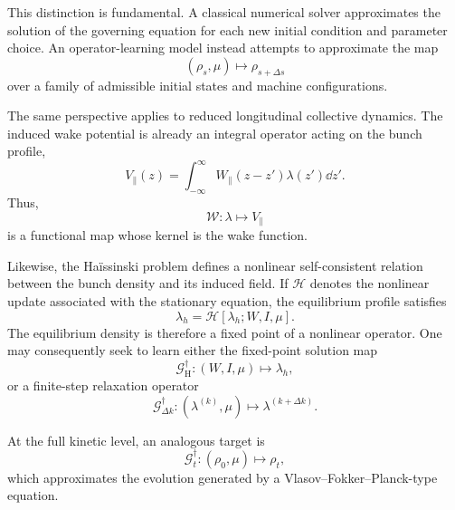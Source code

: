 This distinction is fundamental. A classical numerical solver approximates the solution of the governing equation for each new initial condition and parameter choice. An operator-learning model instead attempts to approximate the map
\begin{equation}
(\rho_s,\mu)
\longmapsto
\rho_{s+\Delta s}
\end{equation}
over a family of admissible initial states and machine configurations.

The same perspective applies to reduced longitudinal collective dynamics. The induced wake potential is already an integral operator acting on the bunch profile, 
\begin{equation}
V_{\parallel}(z)
=
\int_{-\infty}^{\infty}
W_{\parallel}(z-z')
\lambda(z')
\dd z'.
\label{eq:NO_wake_conv}
\end{equation}
Thus,
\begin{equation}
\mathcal{W}
:
\lambda
\longmapsto
V_{\parallel}
\end{equation}
is a functional map whose kernel is the wake function.

Likewise, the Ha\"issinski problem defines a nonlinear self-consistent relation between the bunch density and its induced field. If
$\mathcal{H}$ denotes the nonlinear update associated with the stationary equation, the equilibrium profile satisfies \cite{funkner_haissinski_2025}
\begin{equation}
\lambda_h
=
\mathcal{H}
\left[
\lambda_h;
W,
I,
\mu
\right].
\label{eq:NO_haissinski_fixedpoint}
\end{equation}
The equilibrium density is therefore a fixed point of a nonlinear operator. One may consequently seek to learn either the fixed-point solution map
\begin{equation}
\mathcal{G}^{\dagger}_{\mathrm{H}}
:
(W,I,\mu)
\longmapsto
\lambda_h,
\label{eq:NO_haissinski_operator}
\end{equation}
or a finite-step relaxation operator
\begin{equation}
\mathcal{G}^{\dagger}_{\Delta k}
:
(\lambda^{(k)},\mu)
\longmapsto
\lambda^{(k+\Delta k)}.
\label{eq:NO_relaxation_operator}
\end{equation}

At the full kinetic level, an analogous target is
\begin{equation}
\mathcal{G}^{\dagger}_{t}
:
(\rho_0,\mu)
\longmapsto
\rho_t,
\label{eq:NO_VFP_operator}
\end{equation}
which approximates the evolution generated by a Vlasov--Fokker--Planck-type equation.

